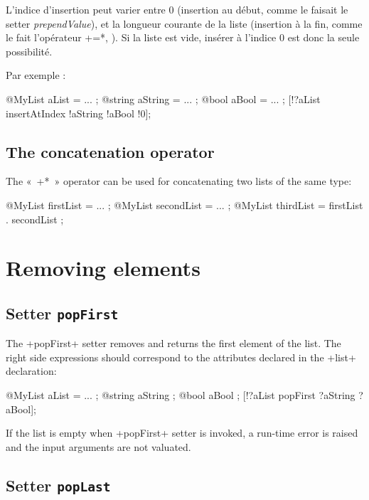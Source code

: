 L'indice d'insertion peut varier entre $0$ (insertion au début, comme le faisait le setter \emph{prependValue}), et la longueur courante de la liste (insertion à la fin, comme le fait l'opérateur \ggs*+=*, ). Si la liste est vide, insérer à l'indice $0$ est donc la seule possibilité.

Par exemple :

\begin{galgas}
@MyList aList = ... ;
@string aString = ... ;
@bool aBool = ... ;
[!?aList insertAtIndex !aString !aBool !0];
\end{galgas}

\subsection{The concatenation operator}

The «~\ggs*+*~» operator can be used for concatenating two lists of the same type:


\begin{galgas}
@MyList firstList = ... ;
@MyList secondList = ... ;
@MyList thirdList = firstList . secondList ;
\end{galgas}

\section{Removing elements}

\subsection{Setter \texttt{popFirst}}


The \ggs+popFirst+ setter removes and returns the first element of the list. The right side expressions should correspond to the attributes declared in the \ggs+list+ declaration:

\begin{galgas}
@MyList aList = ... ;
@string aString ;
@bool aBool ;
[!?aList popFirst ?aString ?aBool];
\end{galgas}

If the list is empty when \ggs+popFirst+ setter is invoked, a run-time error is raised and the input arguments are not valuated.

\subsection{Setter \texttt{popLast}}


